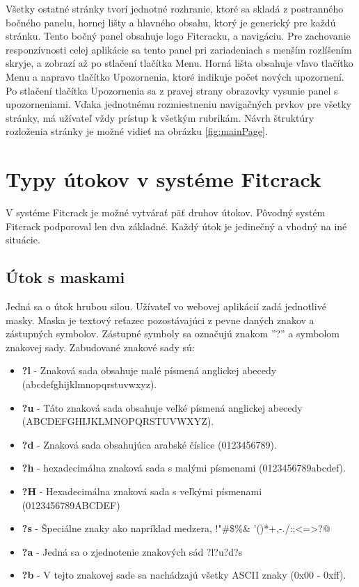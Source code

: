 \documentclass[slovak]{fitthesis}
\begin{document}
Všetky ostatné stránky tvorí jednotné rozhranie, ktoré sa skladá z postranného bočného panelu, hornej lišty a hlavného obsahu, ktorý je generický pre každú stránku. Tento bočný panel obsahuje logo Fitcracku, a navigáciu. Pre zachovanie responzívnosti celej aplikácie sa tento panel pri zariadeniach  s menším rozlíšením skryje, a zobrazí až po stlačení tlačítka Menu. Horná lišta obsahuje vľavo tlačítko Menu a napravo tlačítko Upozornenia, ktoré indikuje počet nových upozornení. Po stlačení tlačítka Upozornenia sa z pravej strany obrazovky vysunie panel s upozorneniami. Vďaka jednotnému rozmiestneniu navigačných prvkov pre všetky stránky, má užívateľ vždy prístup k všetkým rubrikám. Návrh štruktúry rozloženia stránky je možné vidieť na obrázku \ref{fig:mainPage}.


\section{Typy útokov v systéme Fitcrack}
V systéme Fitcrack je možné vytvárať päť druhov útokov. Pôvodný systém Fitcrack podporoval len dva základné. Každý útok je jedinečný a vhodný na iné situácie.


\subsection{Útok s maskami}
Jedná sa o útok hrubou silou. Užívateľ  vo webovej aplikácií zadá jednotlivé masky. Maska je textový reťazec pozostávajúci z pevne daných znakov a zástupných symbolov. Zástupné symboly sa označujú znakom ''?'' a symbolom znakovej sady. Zabudované znakové sady sú:


\begin{itemize}
    \item \textbf{?l} - Znaková sada obsahuje malé písmená anglickej abecedy (abcdefghijklmnopqrstuvwxyz).
    \item \textbf{?u} - Táto znaková sada obsahuje veľké písmená anglickej abecedy (ABCDEFGHIJKLMNOPQRSTUVWXYZ).
    \item \textbf{?d} - Znaková sada obsahujúca arabské číslice (0123456789).
    \item \textbf{?h} - hexadecimálna znaková sada s malými písmenami (0123456789abcdef).
    \item \textbf{?H} - Hexadecimálna znaková sada s veľkými písmenami (0123456789ABCDEF)
    \item \textbf{?s} - Špeciálne znaky ako napríklad medzera, !"\#\$\%\&
    '()*+,-./:;<=>?@
    \item \textbf{?a} - Jedná sa o zjednotenie znakových sád ?l?u?d?s
    \item \textbf{?b} - V tejto znakovej sade sa nachádzajú všetky ASCII znaky (0x00 - 0xff).
\end{itemize}
\end{document}
